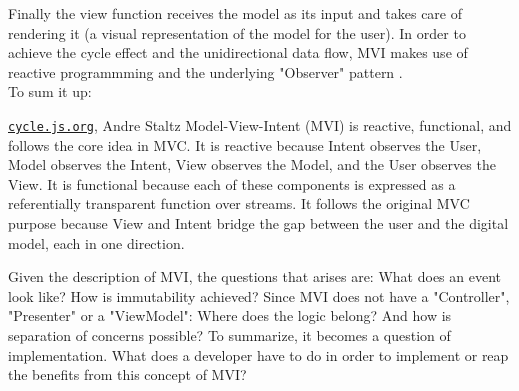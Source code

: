 Finally the view function receives the model as its input and takes care of rendering it (a visual representation of the model for the user). 
In order to achieve the cycle effect and the unidirectional data flow, MVI makes use of reactive programmming 
\cite{reactiveProgrammingIntroAndreStaltz} 
and the underlying "Observer" pattern 
\cite{wikipediaObserverPattern}.
\\
To sum it up:
\begin{pquotation}{\href{https://cycle.js.org/model-view-intent.html#model-view-intent-what-mvc-is-really-about}{\nolinkurl{cycle.js.org}}, Andre Staltz}
    Model-View-Intent (MVI) is reactive, functional, and follows the core idea in MVC. It is reactive because Intent observes the User, Model observes the Intent, 
    View observes the Model, and the User observes the View. It is functional because each of these components is expressed as a referentially transparent function 
    over streams. It follows the original MVC purpose because View and Intent bridge the gap between the user and the digital model, each in one direction.
\end{pquotation}
Given the description of MVI, the questions that arises are: What does an event look like? How is immutability achieved?
Since MVI does not have a "Controller", "Presenter" or a "ViewModel": Where does the logic belong? And how is separation of concerns possible?
To summarize, it becomes a question of implementation. What does a developer have to do in order to implement or reap the benefits from this concept of MVI?

